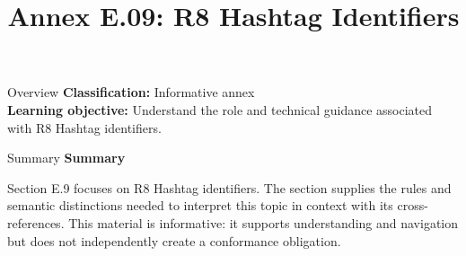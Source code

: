 \documentclass[10pt,letterpaper]{article}
\title{Annex E.09: R8 Hashtag Identifiers}
\author{}
\date{}
\begin{document}
\maketitle
\begin{CornellOverviewBox}{Overview}
\textbf{Classification:} Informative annex\\[2pt]
\textbf{Learning objective:} Understand the role and technical guidance associated with R8 Hashtag identifiers.
\end{CornellOverviewBox}\begin{CornellSummaryBox}{Summary}
{\sffamily\bfseries\color{Accent} Summary}\par\vspace{3pt}Section E.9 focuses on R8 Hashtag identifiers. The section supplies the rules and semantic distinctions needed to interpret this topic in context with its cross-references. This material is informative: it supports understanding and navigation but does not independently create a conformance obligation.
\end{CornellSummaryBox}
\end{document}
